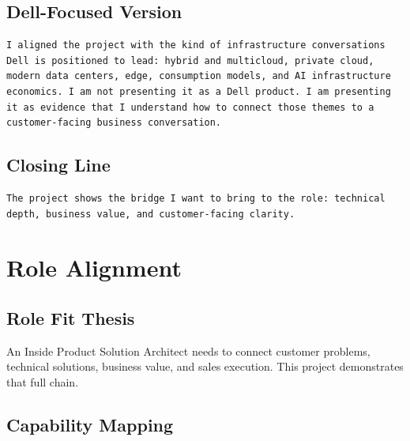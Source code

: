 \documentclass[11pt,a4paper]{article}
\begin{document}
\subsection{Dell-Focused Version}

\begin{lstlisting}
I aligned the project with the kind of infrastructure conversations Dell is positioned to lead: hybrid and multicloud, private cloud, modern data centers, edge, consumption models, and AI infrastructure economics. I am not presenting it as a Dell product. I am presenting it as evidence that I understand how to connect those themes to a customer-facing business conversation.
\end{lstlisting}

\subsection{Closing Line}

\begin{lstlisting}
The project shows the bridge I want to bring to the role: technical depth, business value, and customer-facing clarity.
\end{lstlisting}

\section{Role Alignment}

\subsection{Role Fit Thesis}

An Inside Product Solution Architect needs to connect customer problems, technical solutions, business value, and sales execution. This project demonstrates that full chain.

\subsection{Capability Mapping}
\end{document}

